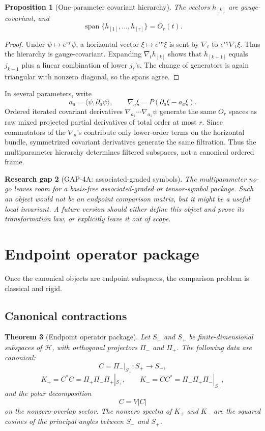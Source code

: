 \documentclass[11pt]{amsart}
\newtheorem{theorem}{Theorem}[section]
\newtheorem{proposition}[theorem]{Proposition}
\newtheorem{gap}[theorem]{Research gap}
\newcommand{\Hilb}{\mathcal H}
\newcommand{\Span}{\operatorname{span}}
\newcommand{\Proj}{\Pi}
\begin{document}
\begin{proposition}[One-parameter covariant hierarchy]
The vectors \(h_{[k]}\) are gauge-covariant, and
\[
        \Span\{h_{[1]},\ldots,h_{[r]}\}=O_r(t).
\]
\end{proposition}

\begin{proof}
Under \(\psi\mapsto e^{i\chi}\psi\), a horizontal vector
\(\xi\mapsto e^{i\chi}\xi\) is sent by \(\nabla_t\) to
\(e^{i\chi}\nabla_t\xi\). Thus the hierarchy is gauge-covariant. Expanding
\(\nabla_t h_{[k]}\) shows that \(h_{[k+1]}\) equals \(j_{k+1}\) plus a
linear combination of lower \(j_\ell\)'s. The change of generators is again
triangular with nonzero diagonal, so the spans agree.
\end{proof}

In several parameters, write
\[
        a_a=\langle\psi,\partial_a\psi\rangle,\qquad
        \nabla_a\xi=P(\partial_a\xi-a_a\xi).
\]
Ordered iterated covariant derivatives
\(\nabla_{a_k}\cdots\nabla_{a_1}\psi\) generate the same \(O_r\) spaces as raw
mixed projected partial derivatives of total order at most \(r\). Since
commutators of the \(\nabla_a\)'s contribute only lower-order terms on the
horizontal bundle, symmetrized covariant derivatives generate the same
filtration. Thus the multiparameter hierarchy determines filtered subspaces,
not a canonical ordered frame.

\begin{gap}[GAP-4A: associated-graded symbols]
The multiparameter no-go leaves room for a basis-free associated-graded or
tensor-symbol package. Such an object would not be an endpoint comparison
matrix, but it might be a useful local invariant. A future version should either
define this object and prove its transformation law, or explicitly leave it out
of scope.
\end{gap}

\section{Endpoint operator package}

Once the canonical objects are endpoint subspaces, the comparison problem is
classical and rigid.

\subsection{Canonical contractions}

\begin{theorem}[Endpoint operator package]
Let \(S_-\) and \(S_+\) be finite-dimensional subspaces of \(\Hilb\), with
orthogonal projectors \(\Proj_-\) and \(\Proj_+\). The following data are
canonical:
\[
        C=\Proj_-|_{S_+}:S_+\to S_-,
\]
\[
        K_+=C^*C=\Proj_+\Proj_-\Proj_+|_{S_+},
        \qquad
        K_-=CC^*=\Proj_-\Proj_+\Proj_-|_{S_-},
\]
and the polar decomposition
\[
        C=V|C|
\]
on the nonzero-overlap sector. The nonzero spectra of \(K_+\) and \(K_-\) are
the squared cosines of the principal angles between \(S_-\) and \(S_+\).
\end{theorem}
\end{document}
